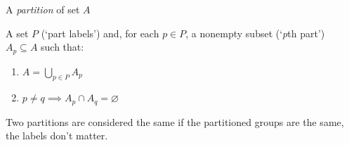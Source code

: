 
A \emph{partition} of set $A$

A set $P$ (`part labels') and, for each $p \in P$, a nonempty subset (`\emph{p}th part') $A_p \subseteq A$ such that:
  \begin{enumerate}
    \item $A = \bigcup_{p \in P}A_p$
    \item $p \ne q \implies A_p \cap A_q = \varnothing$
  \end{enumerate}
  Two partitions are considered the same if the partitioned groups are the same, the labels don't matter.